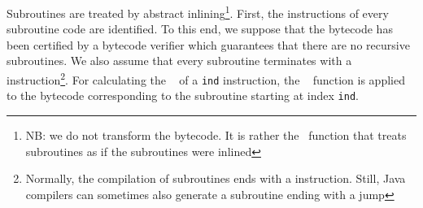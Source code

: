 Subroutines are treated by abstract inlining\footnote{NB: we do not transform the bytecode. It is rather the \wpi \
 function that treats subroutines as if the subroutines were inlined}. First, the instructions of every subroutine code
 are identified. To this end, we suppose that the bytecode has
 been certified by a bytecode verifier which guarantees
that there are no recursive subroutines. We also assume that every subroutine terminates with a  
instruction\footnote{Normally, the compilation of subroutines ends with a \instr{ret} instruction. Still, Java 
compilers can sometimes also generate a subroutine ending with a jump}. For calculating the \wpi~ of a
\instr{jsr}  \texttt{ind} instruction, the \wpi~ function is applied to the bytecode corresponding to
 the subroutine starting at index \texttt{ind}. 


